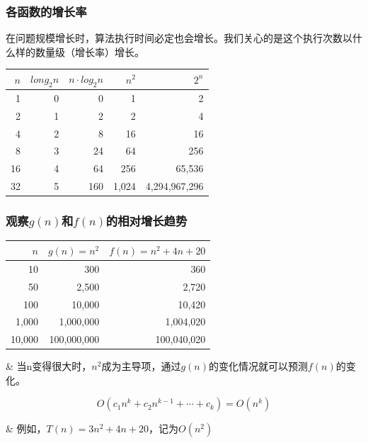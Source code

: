 \begin{frame}[fragile]
  \frametitle{各函数的增长率}
  在问题规模增长时，算法执行时间必定也会增长。我们关心的是这个执行次数以什么样的数量级（增长率）增长。

  \begin{center}
    \begin{tabular}{| r | r | r | r | r |}
      \hline
      $n$ & $long_2{n}$ & $n \cdot log_2 n$ & $n^2$ & $2^n$ \\ \hline
      1 & 0 & 0 & 1 & 2 \\ \hline
      2 & 1 & 2 & 2 & 4 \\ \hline
      4 & 2 & 8 & 16 & 16 \\ \hline
      8 & 3 & 24 & 64 & 256 \\ \hline
      16 & 4 & 64 & 256 & 65,536  \\ \hline
      32 & 5 & 160 & 1,024 & 4,294,967,296  \\ \hline
    \end{tabular}
  \end{center}
\end{frame}

\begin{frame}[fragile]
  \frametitle{观察$g(n)$和$f(n)$的相对增长趋势}

  \begin{center}
    \begin{tabular}{| r | r | r |}
      \hline
      $n$ & $g(n)=n^2$ & $f(n)=n^2+4n+20$ \\ \hline
      10 & 300 & 360  \\ \hline
      50 & 2,500 & 2,720  \\ \hline
      100 & 10,000 & 10,420  \\ \hline
      1,000 & 1,000,000 & 1,004,020  \\ \hline
      10,000 & 100,000,000 & 100,040,020  \\ \hline
    \end{tabular}
  \end{center}

  \begin{easylist}
    & 当n变得很大时，$n^2$成为主导项，通过$g(n)$的变化情况就可以预测$f(n)$的变化。

    \[O(c_1 n^k + c_2 n^{k-1} + \cdots + c_k) = O(n^k)\]

    & 例如，$T(n)=3n^ 2+ 4n + 20$，记为$O(n^2)$
  \end{easylist}
\end{frame}

